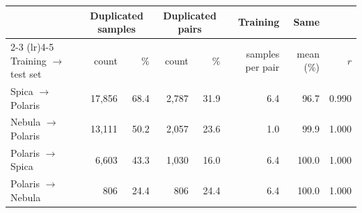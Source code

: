 \begin{tabular}{lrrrrrrr}
\toprule
& \multicolumn{2}{c}{Duplicated samples} & \multicolumn{2}{c}{Duplicated pairs} & Training & Same & \\
\cmidrule(lr){2-3} \cmidrule(lr){4-5}
Training $\rightarrow$ test set & count & \% & count & \% & samples per pair & mean (\%) & $r$ \\
\midrule
Spica $\rightarrow$ Polaris & 17,856 & 68.4 & 2,787 & 31.9 & 6.4 & 96.7 & 0.990 \\
Nebula $\rightarrow$ Polaris & 13,111 & 50.2 & 2,057 & 23.6 & 1.0 & 99.9 & 1.000 \\
Polaris $\rightarrow$ Spica & 6,603 & 43.3 & 1,030 & 16.0 & 6.4 & 100.0 & 1.000 \\
Polaris $\rightarrow$ Nebula & 806 & 24.4 & 806 & 24.4 & 6.4 & 100.0 & 1.000 \\
\bottomrule
\end{tabular}
